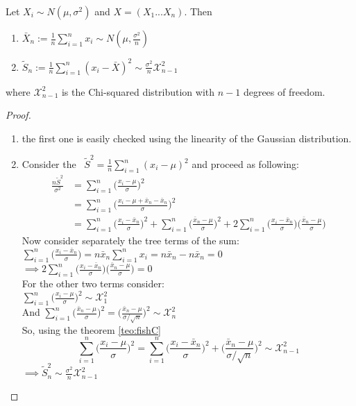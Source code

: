 \begin{prop}
	Let $ X_i\sim N(\mu, \sigma^2)$ and $X=(X_1...X_n)$. Then
	\begin{enumerate}
		\item $\bar X_n:=\frac{1}{n} \sum_{i=1}^n x_i \sim N(\mu, \frac{\sigma^2}{n})$
		\item $\tilde S_n:=\frac{1}{n} \sum_{i=1}^n (x_i - \bar X )^2 \sim \frac{\sigma^2}{n} \mathcal{X}_{n-1}^2$
	\end{enumerate}
	where $\mathcal{X}_{n-1}^2$ is the Chi-squared distribution with $n-1$ degrees of freedom.
\end{prop}
\begin{proof}
	\begin{enumerate}
		\item the first one is easily checked using the linearity of the Gaussian distribution.
		\item Consider the \rv \  $\tilde S^2=\frac{1}{n}\sum_{i=1}^{n}(x_i- \mu)^2$ and proceed as following:
		\[
		\begin{split}
		\frac{n \tilde S^2}{\sigma^2}
		&=\sum_{i=1}^{n} \bigg( \frac{x_i- \mu}{\sigma} \bigg)^2\\
		&=\sum_{i=1}^{n} \bigg( \frac{x_i- \mu +\bar x_n -\bar x_n}{\sigma} \bigg)^2\\
		&=\sum_{i=1}^{n} \bigg( \frac{x_i- \bar x_n}{\sigma} \bigg)^2 + \sum_{i=1}^{n} \bigg( \frac{ \bar x_n - \mu}{\sigma} \bigg)^2 + 2 \sum_{i=1}^{n} \bigg( \frac{x_i- \bar x_n}{\sigma} \bigg) \bigg( \frac{ \bar x_n - \mu}{\sigma} \bigg)
		\end{split}
		\]
		Now consider separately the tree terms of the sum:\\
		$\sum_{i=1}^{n} \bigg( \frac{x_i- \bar x_n}{\sigma} \bigg) =n \bar x_n \sum_{i=1}^{n}x_i=n \bar x_n -n \bar x_n =0$\\
		$\implies 2 \sum_{i=1}^{n} \bigg( \frac{x_i- \bar x_n}{\sigma} \bigg) \bigg( \frac{ \bar x_n - \mu}{\sigma} \bigg)=0$ \\
		For the other two terms consider:\\
		$\sum_{i=1}^{n} \bigg( \frac{x_i- \mu}{\sigma} \bigg)^2 \sim \mathcal{X}_1^2$\\
		And $\sum_{i=1}^{n} \bigg( \frac{ \bar x_n - \mu}{\sigma} \bigg)^2= \bigg( \frac{ \bar x_n - \mu}{\sigma/ \sqrt{n}} \bigg)^2\sim \mathcal{X}_n^2$\\
		So, using the theorem \ref{teo:fishC}\\
		$$\sum_{i=1}^{n} \bigg( \frac{x_i- \mu}{\sigma} \bigg)^2= \sum_{i=1}^{n} \bigg( \frac{x_i- \bar x_n}{\sigma} \bigg)^2 +  \bigg( \frac{ \bar x_n - \mu}{\sigma/ \sqrt{n}} \bigg)^2 \sim \mathcal{X}_{n-1}^2$$
		$\implies \tilde S_n^2\sim \frac{\sigma^2}{n} \mathcal{X}_{n-1}^2 $
	\end{enumerate}
\end{proof}


